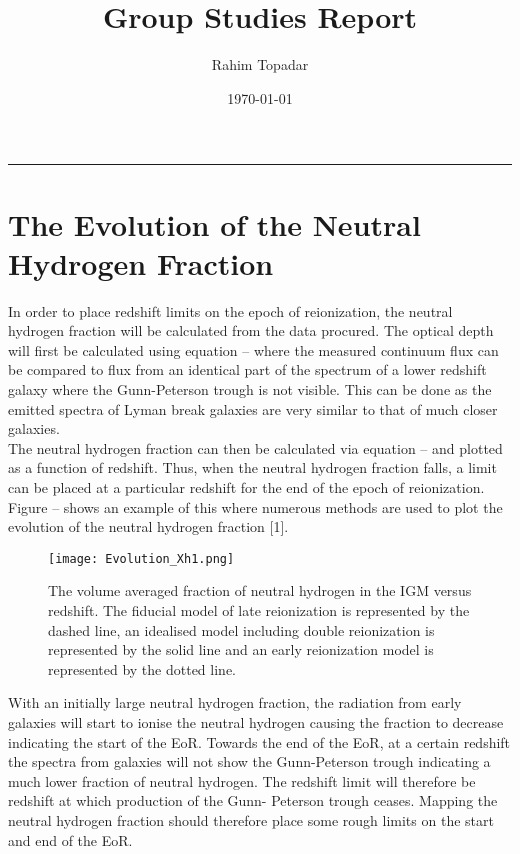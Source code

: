 \documentclass[pdf,color]{UoBnote}
\author{Rahim Topadar}
\title{Group Studies Report}
\date{\today}
\begin{document}
\maketitle
\tableofcontents
\vspace{1cm}\hrule \vspace{1cm}

\section{The Evolution of the Neutral Hydrogen Fraction}

In order to place redshift limits on the epoch of reionization, the neutral hydrogen fraction will be calculated from the data procured. The optical depth will first be calculated using equation – where the measured continuum flux can be compared to flux from an identical part of the spectrum of a lower redshift galaxy where the Gunn-Peterson trough is not visible. This can be done as the emitted spectra of Lyman break galaxies are very similar to that of much closer galaxies. \\
\newline
The neutral hydrogen fraction can then be calculated via equation – and plotted as a function of redshift. Thus, when the neutral hydrogen fraction falls, a limit can be placed at a particular redshift for the end of the epoch of reionization. Figure – shows an example of this where numerous methods are used to plot the evolution of the neutral hydrogen fraction [1].\\ %



\begin{figure}[H]
\begin{center}
\texttt{[image: Evolution\_Xh1.png]}
\end{center}
\caption{The volume averaged fraction of neutral hydrogen in the IGM versus redshift. The fiducial model of late reionization is represented by the dashed line, an idealised model including double reionization is represented by the solid line and an early reionization model is represented by the dotted line.}\label{fig:figure1}
\end{figure}
\noindent
With an initially large neutral hydrogen fraction, the radiation from early galaxies will start to ionise the neutral hydrogen causing the fraction to decrease indicating the start of the EoR. Towards the end of the EoR, at a certain redshift the spectra from galaxies will not show the Gunn-Peterson trough indicating a much lower fraction of neutral hydrogen. The redshift limit will therefore be redshift at which production of the Gunn- Peterson trough ceases. Mapping the neutral hydrogen fraction should therefore place some rough limits on the start and end of the EoR. \\
\end{document}

